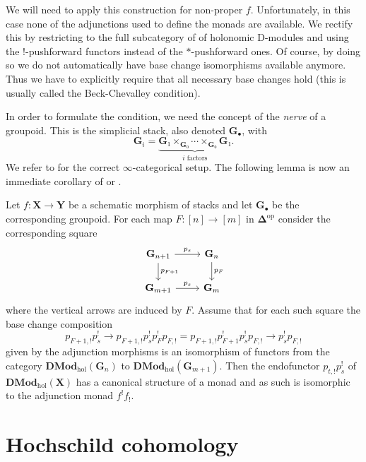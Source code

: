 \documentclass[english]{ck-article}
\newcommand\cat{\mathbf}
\newcommand\catDMod[2][]{\cat{DMod}_{#1}(#2)}
\newcommand\catDModHol[1]{\catDMod[\mathrm{hol}]{#1}}
\let\stack\mathbf
\newcommand\cx\bullet
\newcommand\ΓdR{Γ_{\mkern-4mu\dR}}
\newcommand\Γsub[1]{\Gamma_{\mkern-3mu#1}}
\newcommand{\RomanNum}[1]{#1}
\begin{document}
We will need to apply this construction for non-proper $f$.
Unfortunately, in this case none of the adjunctions used to define the monads are available.
We rectify this by restricting to the full subcategory of of holonomic D-modules and using the $!$-pushforward functors instead of the $*$-pushforward ones.
Of course, by doing so we do not automatically have base change isomorphisms available anymore.
Thus we have to explicitly require that all necessary base changes hold (this is usually called the Beck-Chevalley condition).

In order to formulate the condition, we need the concept of the \emph{nerve} of a groupoid.
This is the simplicial stack, also denoted $\stack{G}_\cx$, with
\[
    \stack G_i = \underbrace{\stack G₁ ×_{\stack G₀} \dotsb ×_{\stack G₀} \stack G₁}_{\text{$i$ factors}}.
\]
We refer to \cite[Section~6.1.2]{Lurie:2009:HigherToposTheory} for the correct $∞$-categorical setup.
The following lemma is now an immediate corollary of \cite[Lemma~\RomanNum{II}.1.7.1.4]{GaitsgoryRozenblyum:prelim:StudyInDAG} or \cite[Theorem~4.7.6.2]{Lurie:2014-draft:HigherAlgebra}.

\begin{Lem}
    \label{lem:pre:groupoid_monad_hol}%
    Let $f\colon \stack X → \stack Y$ be a schematic morphism of stacks and let $\stack G_\cx$ be the corresponding groupoid.
    For each map $F\colon [n] → [m]$ in $\cat{Δ}^{\mathrm{op}}$ consider the corresponding square
    \[
        \begin{tikzcd}
            \stack G_{n+1} \arrow{r}{p_s} \arrow{d}{p_{F+1}} & \stack G_n \arrow{d}{p_F} \\
            \stack G_{m+1} \arrow{r}{p_s} & \stack G_m
        \end{tikzcd}
    \]
    where the vertical arrows are induced by $F$.
    Assume that for each such square the base change composition
    \[
        p_{F+1,!} p_s^! →
        p_{F+1,!} p_s^! p_F^! p_{F,!} =
        p_{F+1,!} p_{F+1}^! p_s^!  p_{F,!} →
        p_s^! p_{F,!}
    \]
    given by the adjunction morphisms is an isomorphism of functors from the category $\catDModHol{\stack G_n}$ to $\catDModHol{\stack G_{m+1}}$.
    Then the endofunctor $p_{t,!} p_s^!$ of $\catDModHol{\stack X}$ has a canonical structure of a monad and as such is isomorphic to the adjunction monad $f^!f_!$.
\end{Lem}

\section{Hochschild cohomology}
\end{document}
